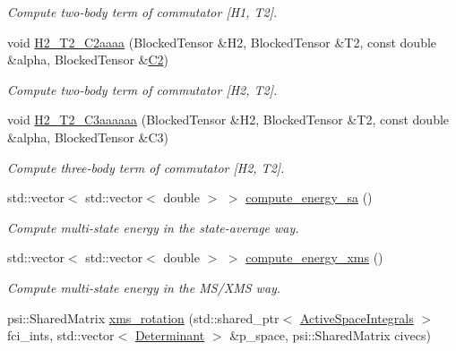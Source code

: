 \begin{DoxyCompactItemize}
\begin{DoxyCompactList}\small\item\em Compute two-\/body term of commutator \mbox{[}H1, T2\mbox{]}. \end{DoxyCompactList}\item 
void \mbox{\hyperlink{classforte_1_1_d_s_r_g___m_r_p_t2_a2b61743d0e4f4ebdedbe88a665256ec4}{H2\+\_\+\+T2\+\_\+\+C2aaaa}} (Blocked\+Tensor \&H2, Blocked\+Tensor \&T2, const double \&alpha, Blocked\+Tensor \&\mbox{\hyperlink{namespaceforte_abe00ec86d0015c0f2b6ac298c6e428e4af1a543f5a2c5d49bc5dde298fcf716e4}{C2}})
\begin{DoxyCompactList}\small\item\em Compute two-\/body term of commutator \mbox{[}H2, T2\mbox{]}. \end{DoxyCompactList}\item 
void \mbox{\hyperlink{classforte_1_1_d_s_r_g___m_r_p_t2_a5c2e5b5ff81053c3b0b95379b42b1fa7}{H2\+\_\+\+T2\+\_\+\+C3aaaaaa}} (Blocked\+Tensor \&H2, Blocked\+Tensor \&T2, const double \&alpha, Blocked\+Tensor \&C3)
\begin{DoxyCompactList}\small\item\em Compute three-\/body term of commutator \mbox{[}H2, T2\mbox{]}. \end{DoxyCompactList}\item 
std\+::vector$<$ std\+::vector$<$ double $>$ $>$ \mbox{\hyperlink{classforte_1_1_d_s_r_g___m_r_p_t2_a186a43767e4fc38f772b5fb62127d1c4}{compute\+\_\+energy\+\_\+sa}} ()
\begin{DoxyCompactList}\small\item\em Compute multi-\/state energy in the state-\/average way. \end{DoxyCompactList}\item 
std\+::vector$<$ std\+::vector$<$ double $>$ $>$ \mbox{\hyperlink{classforte_1_1_d_s_r_g___m_r_p_t2_a4b33c1f5ff523f6ee67f8a52e503f473}{compute\+\_\+energy\+\_\+xms}} ()
\begin{DoxyCompactList}\small\item\em Compute multi-\/state energy in the M\+S/\+X\+MS way. \end{DoxyCompactList}\item 
psi\+::\+Shared\+Matrix \mbox{\hyperlink{classforte_1_1_d_s_r_g___m_r_p_t2_a43625a369c2b1282becd2c0b2354765c}{xms\+\_\+rotation}} (std\+::shared\+\_\+ptr$<$ \mbox{\hyperlink{classforte_1_1_active_space_integrals}{Active\+Space\+Integrals}} $>$ fci\+\_\+ints, std\+::vector$<$ \mbox{\hyperlink{namespaceforte_a2076c63fd7b8732004d9e1442ce527c1}{Determinant}} $>$ \&p\+\_\+space, psi\+::\+Shared\+Matrix civecs)

\end{DoxyCompactItemize}
